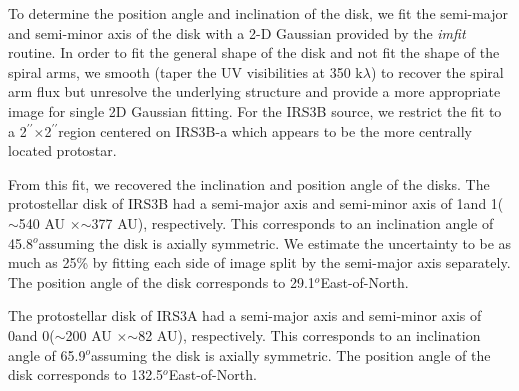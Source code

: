 \documentclass[preprint,12pt]{aastex62}
\renewcommand{\arcsec}{$^{\prime\prime}$}
\renewcommand{\deg}{$^{o}$}
\newcommand{\ab}{$\sim$}
\begin{document}
To determine the position angle and inclination of the disk, we fit the semi-major and semi-minor axis of the disk with a 2-D Gaussian provided by the \textit{imfit} routine. In order to fit the general shape of the disk and not fit the shape of the spiral arms, we smooth (taper the UV visibilities at 350 k$\lambda$) to recover the spiral arm flux but unresolve the underlying structure and provide a more appropriate image for single 2D Gaussian fitting. For the IRS3B source, we restrict the fit to a 2\arcsec$\times$2\arcsec\space region centered on IRS3B-a which appears to be the more centrally located protostar. 

From this fit, we recovered the inclination and position angle of the disks. The protostellar disk of IRS3B had a semi-major axis and semi-minor axis of 1\space and 1\space (\ab540 AU $\times$\space \ab377 AU), respectively. This corresponds to an inclination angle of 45.8\deg\space assuming the disk is axially symmetric. We estimate the uncertainty to be as much as 25\% \space by fitting each side of image split by the semi-major axis separately. The position angle of the disk corresponds to 29.1\deg\space East-of-North.

The protostellar disk of IRS3A had a semi-major axis and semi-minor axis of 0\space and 0\space(\ab200 AU $\times$\space \ab82 AU), respectively. This corresponds to an inclination angle of 65.9\deg assuming the disk is axially symmetric. The position angle of the disk corresponds to 132.5\deg\space East-of-North.

\end{document}
